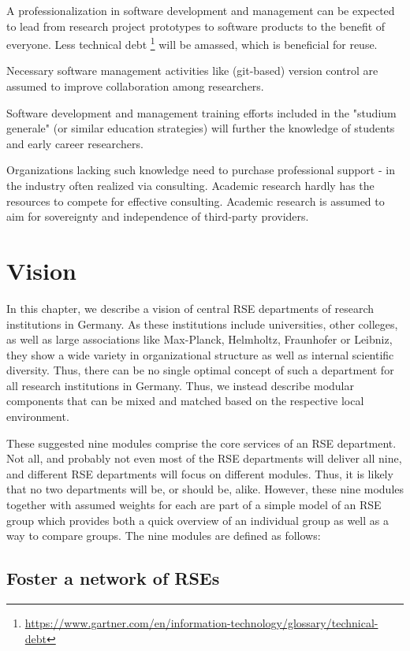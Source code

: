 \documentclass[a4paper]{article}
\begin{document}
A professionalization in software development and management can be expected to lead from research project prototypes to software products to the benefit of everyone.
Less technical debt \footnote{\url{https://www.gartner.com/en/information-technology/glossary/technical-debt}} will be amassed, which is beneficial for reuse.

Necessary software management activities like (git-based) version control are assumed to improve collaboration among researchers.

Software development and management training efforts included in the "studium generale" (or similar education strategies) will further the knowledge of students and early career researchers.

Organizations lacking such knowledge need to purchase professional support - in the industry often realized via consulting.
Academic research hardly has the resources to compete for effective consulting.
Academic research is assumed to aim for sovereignty and independence of third-party providers.

\section{Vision}
\label{sec:vision}
In this chapter, we describe a vision of central RSE departments of research institutions in Germany.
As these institutions include universities, other colleges, as well as large associations like Max-Planck, Helmholtz, Fraunhofer or Leibniz,
they show a wide variety in organizational structure as well as internal scientific diversity.
Thus, there can be no single optimal concept of such a department for all research institutions in Germany.
Thus, we instead describe modular components that can be mixed and matched based on the respective local environment.

These suggested nine modules comprise the core services of an RSE department.
Not all, and probably not even most of the RSE departments will deliver all nine, and different RSE departments will focus on different modules.
Thus, it is likely that no two departments will be, or should be, alike.
However, these nine modules together with assumed weights for each are part of a simple model of an RSE group which provides both a quick overview of an individual group as well as a way to compare groups.
The nine modules are defined as follows:

\subsection{Foster a network of RSEs}
\label{sec:network}
\end{document}
